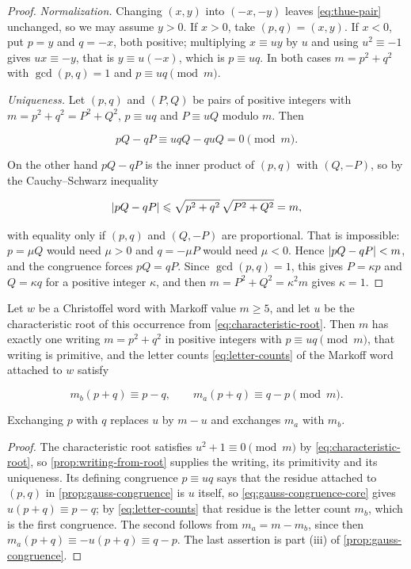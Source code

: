 \begin{proof}
\emph{Normalization.} Changing $(x,y)$ into $(-x,-y)$ leaves
\cref{eq:thue-pair} unchanged, so we may assume $y>0$. If $x>0$, take
$(p,q)=(x,y)$. If $x<0$, put $p=y$ and $q=-x$, both positive; multiplying
$x\equiv uy$ by $u$ and using $u^2\equiv-1$ gives $ux\equiv-y$, that is
$y\equiv u(-x)$, which is $p\equiv uq$. In both cases $m=p^2+q^2$ with
$\gcd(p,q)=1$ and $p\equiv uq\pmod m$.

\emph{Uniqueness.} Let $(p,q)$ and $(P,Q)$ be pairs of positive integers with
$m=p^2+q^2=P^2+Q^2$, $p\equiv uq$ and $P\equiv uQ$ modulo $m$. Then

\begin{equation}
 pQ-qP\equiv uqQ-quQ=0\pmod m.
\end{equation}

On the other hand $pQ-qP$ is the inner product of $(p,q)$ with $(Q,-P)$, so by
the Cauchy--Schwarz inequality

\begin{equation}
 \lvert pQ-qP\rvert\leqslant\sqrt{p^2+q^2}\,\sqrt{P^2+Q^2}=m,
\end{equation}

with equality only if $(p,q)$ and $(Q,-P)$ are proportional. That is
impossible: $p=\mu Q$ would need $\mu>0$ and $q=-\mu P$ would need $\mu<0$.
Hence $\lvert pQ-qP\rvert<m$, and the congruence forces $pQ=qP$. Since
$\gcd(p,q)=1$, this gives $P=\kappa p$ and $Q=\kappa q$ for a positive integer
$\kappa$, and then $m=P^2+Q^2=\kappa^2m$ gives $\kappa=1$.
\end{proof}

\begin{corollary}
\label{cor:writing-letter-counts}
Let $w$ be a Christoffel word with Markoff value $m\geqslant5$, and let $u$ be
the characteristic root of this occurrence from
\cref{eq:characteristic-root}. Then $m$ has exactly one writing $m=p^2+q^2$
in positive integers with $p\equiv uq\pmod m$, that writing is primitive, and
the letter counts \cref{eq:letter-counts} of the Markoff word attached to $w$
satisfy

\begin{equation}
 m_b(p+q)\equiv p-q,
 \qquad
 m_a(p+q)\equiv q-p
 \pmod m.
 \label{eq:letter-counts-congruence}
\end{equation}

Exchanging $p$ with $q$ replaces $u$ by $m-u$ and exchanges $m_a$ with $m_b$.
\end{corollary}

\begin{proof}
The characteristic root satisfies $u^2+1\equiv0\pmod m$ by
\cref{eq:characteristic-root}, so \cref{prop:writing-from-root} supplies the
writing, its primitivity and its uniqueness. Its defining congruence
$p\equiv uq$ says that the residue attached to $(p,q)$ in
\cref{prop:gauss-congruence} is $u$ itself, so
\cref{eq:gauss-congruence-core} gives $u(p+q)\equiv p-q$; by
\cref{eq:letter-counts} that residue is the letter count $m_b$, which is the
first congruence. The second follows from $m_a=m-m_b$, since then
$m_a(p+q)\equiv-u(p+q)\equiv q-p$. The last assertion is part (iii) of
\cref{prop:gauss-congruence}.
\end{proof}

